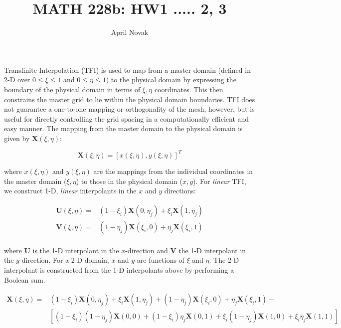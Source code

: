 \documentclass[10pt]{article}
\begin{document}
\title{MATH 228b: HW1 ..... 2, 3}
\author{April Novak}

\maketitle

\section{}

Transfinite Interpolation (TFI) is used to map from a master domain (defined in 2-D over \(0\leq\xi\leq1\) and \(0\leq\eta\leq1\)) to the physical domain by expressing the boundary of the physical domain in terms of \(\xi,\eta\) coordinates. This then constrains the master grid to lie within the physical domain boundaries. TFI does not guarantee a one-to-one mapping or orthogonality of the mesh, however, but is useful for directly controlling the grid spacing in a computationally efficient and easy manner. The mapping from the master domain to the physical domain is given by \(\textbf{X}(\xi,\eta)\):

\begin{equation}
\textbf{X}(\xi,\eta)=\left\lbrack x(\xi,\eta), y(\xi,\eta)\right\rbrack^T
\end{equation}

where \(x(\xi,\eta)\) and \(y(\xi,\eta)\) are the mappings from the individual coordinates in the master domain (\(\xi,\eta\)) to those in the physical domain (\(x,y\)). For \textit{linear} TFI, we construct 1-D, \textit{linear} interpolants in the \(x\) and \(y\) directions:

\begin{equation}
\begin{aligned}
\textbf{U}(\xi,\eta)=& (1-\xi_i)\textbf{X}(0,\eta_j)+\xi_i\textbf{X}(1,\eta_j)\\
\textbf{V}(\xi,\eta)=& (1-\eta_j)\textbf{X}(\xi_i,0)+\eta_j\textbf{X}(\xi_i,1)\\
\end{aligned}
\end{equation}

where \(\textbf{U}\) is the 1-D interpolant in the \(x\)-direction and \(\textbf{V}\) the 1-D interpolant in the \(y\)-direction. For a 2-D domain, \(x\) and \(y\) are functions of \(\xi\) and \(\eta\). The 2-D interpolant is constructed from the 1-D interpolants above by performing a Boolean sum.

\begin{equation}
\begin{aligned}
\textbf{X}(\xi,\eta)=& (1-\xi_i)\textbf{X}(0,\eta_j)+\xi_i\textbf{X}(1,\eta_j) + (1-\eta_j)\textbf{X}(\xi_i,0)+\eta_j\textbf{X}(\xi_i,1) - \\
& \left\lbrack(1-\xi_i)(1-\eta_j)\textbf{X}(0,0)+(1-\xi_i)\eta_j\textbf{X}(0,1)+\xi_i(1-\eta_j)\textbf{X}(1,0)+\xi_i\eta_j\textbf{X}(1,1)\right\rbrack
\end{aligned}
\end{equation}
\end{document}
